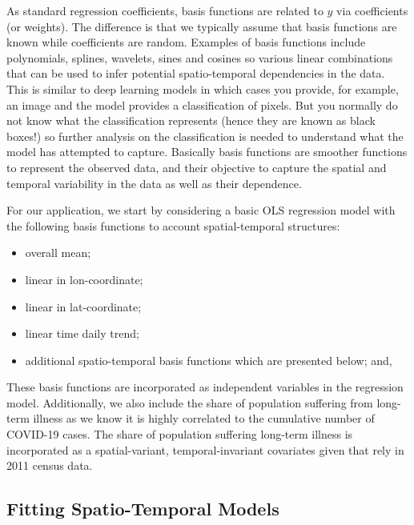 \documentclass[
  letterpaper,
  DIV=11,
  numbers=noendperiod,
  oneside]{scrreprt}
\providecommand{\tightlist}{%
  \setlength{\itemsep}{0pt}\setlength{\parskip}{0pt}}\usepackage{longtable,booktabs,array}
\begin{document}
As standard regression coefficients, basis functions are related to
\(y\) via coefficients (or weights). The difference is that we typically
assume that basis functions are known while coefficients are random.
Examples of basis functions include polynomials, splines, wavelets,
sines and cosines so various linear combinations that can be used to
infer potential spatio-temporal dependencies in the data. This is
similar to deep learning models in which cases you provide, for example,
an image and the model provides a classification of pixels. But you
normally do not know what the classification represents (hence they are
known as black boxes!) so further analysis on the classification is
needed to understand what the model has attempted to capture. Basically
basis functions are smoother functions to represent the observed data,
and their objective to capture the spatial and temporal variability in
the data as well as their dependence.

For our application, we start by considering a basic OLS regression
model with the following basis functions to account spatial-temporal
structures:

\begin{itemize}
\tightlist
\item
  overall mean;
\item
  linear in lon-coordinate;
\item
  linear in lat-coordinate;
\item
  linear time daily trend;
\item
  additional spatio-temporal basis functions which are presented below;
  and,
\end{itemize}

These basis functions are incorporated as independent variables in the
regression model. Additionally, we also include the share of population
suffering from long-term illness as we know it is highly correlated to
the cumulative number of COVID-19 cases. The share of population
suffering long-term illness is incorporated as a spatial-variant,
temporal-invariant covariates given that rely in 2011 census data.

\subsection{Fitting Spatio-Temporal
Models}\label{fitting-spatio-temporal-models}
\end{document}
